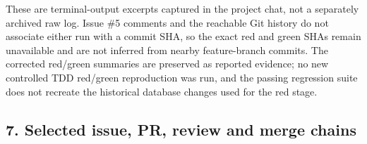 \documentclass[12pt,a4paper]{article}
\begin{document}
These are terminal-output excerpts captured in the project chat, not a separately archived raw log. Issue \#5 comments and the reachable Git history do not associate either run with a commit SHA, so the exact red and green SHAs remain unavailable and are not inferred from nearby feature-branch commits. The corrected red/green summaries are preserved as reported evidence; no new controlled TDD red/green reproduction was run, and the passing regression suite does not recreate the historical database changes used for the red stage.

\subsection*{7. Selected issue, PR, review and merge chains}
\end{document}
